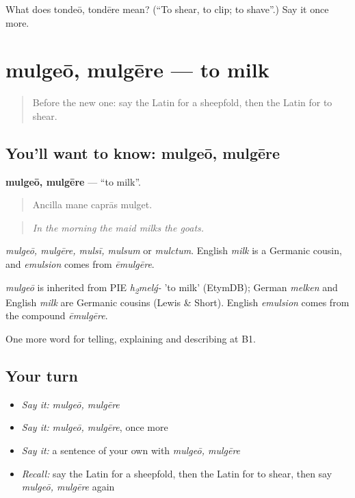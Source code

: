 \begin{tcolorbox}[breakable,colback=teal!4,colframe=teal!35!black,title={Before you move on}]
What does tondeō, tondēre mean? (\textquotedblleft{}To shear, to clip; to shave\textquotedblright{}.) Say it once more.
\end{tcolorbox}
\section[mulgeō, mulgēre]{mulgeō, mulgēre — to milk}

\label{lesson:LA-C478-mulgeo}



\begin{quote}
Before the new one: say the Latin for a sheepfold, then the Latin for to shear.
\end{quote}

\subsection*{You'll want to know: mulgeō, mulgēre}
\textbf{mulgeō, mulgēre} — \textquotedblleft{}to milk\textquotedblright{}.

\begin{quote}
Ancilla mane caprās mulget.
\end{quote}

\begin{quote}
\emph{In the morning the maid milks the goats.}
\end{quote}

\emph{mulgeō, mulgēre, mulsī, mulsum} or \emph{mulctum}. English \emph{milk} is a Germanic cousin, and \emph{emulsion} comes from \emph{ēmulgēre}.

\begin{cousinweb}
\emph{mulgeō} is inherited from PIE \emph{h\textsubscript{2}melǵ-} 'to milk' (EtymDB); German \emph{melken} and English \emph{milk} are Germanic cousins (Lewis \& Short). English \emph{emulsion} comes from the compound \emph{ēmulgēre}.
\end{cousinweb}

\begin{grammarlens}[title={What you've built}]
One more word for telling, explaining and describing at B1.
\end{grammarlens}

\subsection*{Your turn}
\begin{itemize}
\raggedright
  \item \emph{Say it:} \emph{mulgeō, mulgēre}
  \item \emph{Say it:} \emph{mulgeō, mulgēre}, once more
  \item \emph{Say it:} a sentence of your own with \emph{mulgeō, mulgēre}
  \item \emph{Recall:} say the Latin for a sheepfold, then the Latin for to shear, then say \emph{mulgeō, mulgēre} again
\end{itemize}

